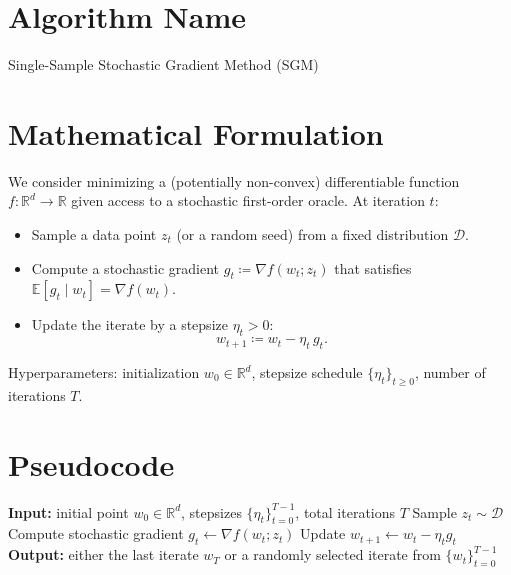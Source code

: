 \documentclass[11pt]{article}
\begin{document}
\section*{Algorithm Name}
Single-Sample Stochastic Gradient Method (SGM)

\section*{Mathematical Formulation}
We consider minimizing a (potentially non-convex) differentiable function $f:\mathbb{R}^d\to\mathbb{R}$ given access to a stochastic first-order oracle. At iteration $t$:
\begin{itemize}
    \item Sample a data point $z_t$ (or a random seed) from a fixed distribution $\mathcal{D}$.
    \item Compute a stochastic gradient $g_t \coloneqq \nabla f(w_t; z_t)$ that satisfies $\mathbb{E}[g_t \mid w_t] = \nabla f(w_t)$.
    \item Update the iterate by a stepsize $\eta_t>0$:
    \[
        w_{t+1} \coloneqq w_t - \eta_t \, g_t.
    \]
\end{itemize}
Hyperparameters: initialization $w_0\in\mathbb{R}^d$, stepsize schedule $\{\eta_t\}_{t\ge 0}$, number of iterations $T$.

\section*{Pseudocode}
\begin{algorithm}[H]
\caption{Single-Sample Stochastic Gradient Method (SGM)}
\begin{algorithmic}[1]
\State \textbf{Input:} initial point $w_0\in\mathbb{R}^d$, stepsizes $\{\eta_t\}_{t=0}^{T-1}$, total iterations $T$
    \State Sample $z_t \sim \mathcal{D}$
    \State Compute stochastic gradient $g_t \gets \nabla f(w_t; z_t)$
    \State Update $w_{t+1} \gets w_t - \eta_t g_t$
\EndFor
\State \textbf{Output:} either the last iterate $w_T$ or a randomly selected iterate from $\{w_t\}_{t=0}^{T-1}$
\end{algorithmic}
\end{algorithm}
\end{document}
